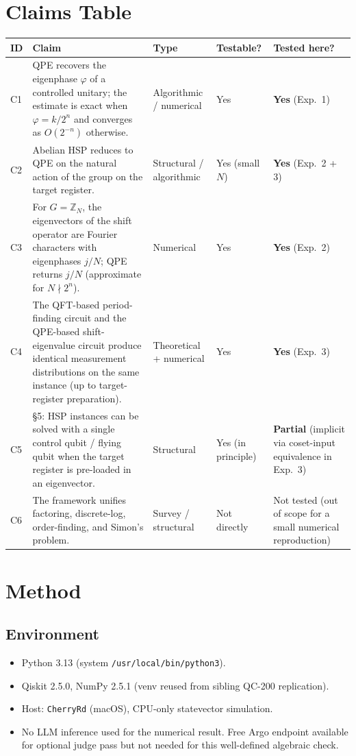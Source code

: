 \documentclass[11pt]{article}
\begin{document}
\section{Claims Table}
\begin{longtable}{@{}p{}p{}p{}p{}p{}@{}}
\toprule
\textbf{ID} & \textbf{Claim} & \textbf{Type} & \textbf{Testable?} & \textbf{Tested here?} \\
\midrule
C1 & QPE recovers the eigenphase $\varphi$ of a controlled unitary; the estimate is exact when $\varphi=k/2^n$ and converges as $O(2^{-n})$ otherwise. & Algorithmic / numerical & Yes & \textbf{Yes} (Exp.\ 1) \\
C2 & Abelian HSP reduces to QPE on the natural action of the group on the target register. & Structural / algorithmic & Yes (small $N$) & \textbf{Yes} (Exp.\ 2 + 3) \\
C3 & For $G=\mathbb{Z}_N$, the eigenvectors of the shift operator are Fourier characters with eigenphases $j/N$; QPE returns $j/N$ (approximate for $N\nmid 2^n$). & Numerical & Yes & \textbf{Yes} (Exp.\ 2) \\
C4 & The QFT-based period-finding circuit and the QPE-based shift-eigenvalue circuit produce identical measurement distributions on the same instance (up to target-register preparation). & Theoretical + numerical & Yes & \textbf{Yes} (Exp.\ 3) \\
C5 & \S 5: HSP instances can be solved with a single control qubit / flying qubit when the target register is pre-loaded in an eigenvector. & Structural & Yes (in principle) & \textbf{Partial} (implicit via coset-input equivalence in Exp.\ 3) \\
C6 & The framework unifies factoring, discrete-log, order-finding, and Simon's problem. & Survey / structural & Not directly & Not tested (out of scope for a small numerical reproduction) \\
\bottomrule
\end{longtable}

\section{Method}

\subsection{Environment}
\begin{itemize}
\item Python 3.13 (system \texttt{/usr/local/bin/python3}).
\item Qiskit 2.5.0, NumPy 2.5.1 (venv reused from sibling QC-200 replication).
\item Host: \texttt{CherryRd} (macOS), CPU-only statevector simulation.
\item No LLM inference used for the numerical result. Free Argo endpoint available for optional judge pass but not needed for this well-defined algebraic check.
\end{itemize}
\end{document}
